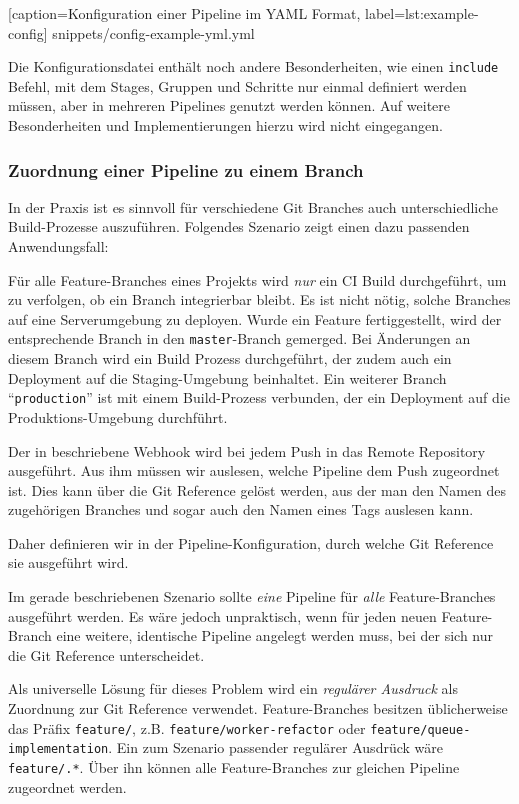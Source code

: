 
  [caption={Konfiguration einer Pipeline im YAML Format},
  label={lst:example-config}]
  {snippets/config-example-yml.yml}

Die Konfigurationsdatei enthält noch andere Besonderheiten, wie einen \texttt{include} Befehl, mit dem Stages, Gruppen und Schritte nur einmal definiert werden müssen, aber in mehreren Pipelines genutzt werden können. Auf weitere Besonderheiten und Implementierungen hierzu wird nicht eingegangen.

\subsubsection{Zuordnung einer Pipeline zu einem Branch}
\label{subsec:git-reference}

In der Praxis ist es sinnvoll für verschiedene Git Branches auch unterschiedliche Build-Prozesse auszuführen. Folgendes Szenario zeigt einen dazu passenden Anwendungsfall:

Für alle Feature-Branches eines Projekts wird \emph{nur} ein \ac{CI} Build durchgeführt, um zu verfolgen, ob ein Branch integrierbar bleibt. Es ist nicht nötig, solche Branches auf eine Serverumgebung zu deployen. Wurde ein Feature fertiggestellt, wird der entsprechende Branch in den \texttt{master}-Branch gemerged. Bei Änderungen an diesem Branch wird ein Build Prozess durchgeführt, der zudem auch ein Deployment auf die Staging-Umgebung beinhaltet. Ein weiterer Branch ``\texttt{production}'' ist mit einem Build-Prozess verbunden, der ein Deployment auf die Produktions-Umgebung durchführt.

Der in  beschriebene Webhook wird bei jedem Push in das Remote Repository ausgeführt. Aus ihm müssen wir auslesen, welche Pipeline dem Push zugeordnet ist. Dies kann über die Git Reference gelöst werden, aus der man den Namen des zugehörigen Branches und sogar auch den Namen eines Tags auslesen kann.

Daher definieren wir in der Pipeline-Konfiguration, durch welche Git Reference sie ausgeführt wird.

Im gerade beschriebenen Szenario sollte \emph{eine} Pipeline für \emph{alle} Feature-Branches ausgeführt werden. Es wäre jedoch unpraktisch, wenn für jeden neuen Feature-Branch eine weitere, identische Pipeline angelegt werden muss, bei der sich nur die Git Reference unterscheidet.

Als universelle Lösung für dieses Problem wird ein \emph{regulärer Ausdruck} als Zuordnung zur Git Reference verwendet. Feature-Branches besitzen üblicherweise das Präfix \texttt{feature/}, z.B. \texttt{feature\allowbreak /worker\allowbreak -refactor} oder \texttt{feature/\allowbreak queue\allowbreak -imple\-men\-ta\-tion}. Ein zum Szenario passender regulärer Ausdrück wäre \texttt{feature/.*}. Über ihn können alle Feature-Branches zur gleichen Pipeline zugeordnet werden.

